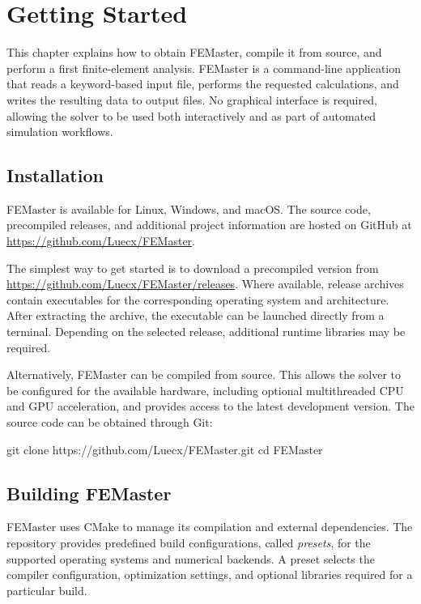 
\chapter{Getting Started}
\label{chap:getting-started}

This chapter explains how to obtain FEMaster, compile it from source, and
perform a first finite-element analysis. FEMaster is a command-line
application that reads a keyword-based input file, performs the requested
calculations, and writes the resulting data to output files. No graphical
interface is required, allowing the solver to be used both interactively
and as part of automated simulation workflows.


\section{Installation}

FEMaster is available for Linux, Windows, and macOS. The source code,
precompiled releases, and additional project information are hosted on
GitHub at \url{https://github.com/Luecx/FEMaster}.

The simplest way to get started is to download a precompiled version
from \url{https://github.com/Luecx/FEMaster/releases}. Where available,
release archives contain executables for the corresponding operating
system and architecture. After extracting the archive, the executable
can be launched directly from a terminal. Depending on the selected
release, additional runtime libraries may be required.

Alternatively, FEMaster can be compiled from source. This allows the
solver to be configured for the available hardware, including optional
multithreaded CPU and GPU acceleration, and provides access to the
latest development version. The source code can be obtained through
Git:

\begin{shellcmd}
git clone https://github.com/Luecx/FEMaster.git
cd FEMaster
\end{shellcmd}


\section{Building FEMaster}

FEMaster uses CMake to manage its compilation and external dependencies.
The repository provides predefined build configurations, called
\emph{presets}, for the supported operating systems and numerical
backends. A preset selects the compiler configuration, optimization
settings, and optional libraries required for a particular build.

